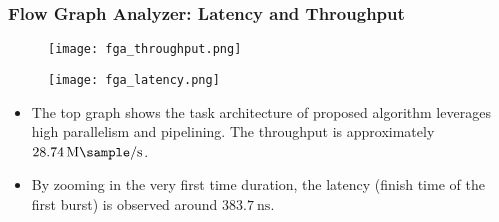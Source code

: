 \begin{frame}
  \end{frame}


  \begin{frame}
    \frametitle{Flow Graph Analyzer: Latency and Throughput}

    \begin{figure}
        \centering
          \texttt{[image: fga\_throughput.png]}
    \end{figure}

    \begin{figure}
      \centering
        \texttt{[image: fga\_latency.png]}
  \end{figure}

    \begin{itemize}
        \item The top graph shows the task architecture of proposed algorithm leverages high parallelism and pipelining. The throughput is approximately 
        $ \SI[per-mode=symbol]{28.74}{\mega\sample\per\second}$.
        \item By zooming in the very first time duration, the latency (finish time of the first burst) is observed around $ \SI[per-mode=symbol]{383.7}{\nano\second}$.

    \end{itemize}
  \end{frame}


